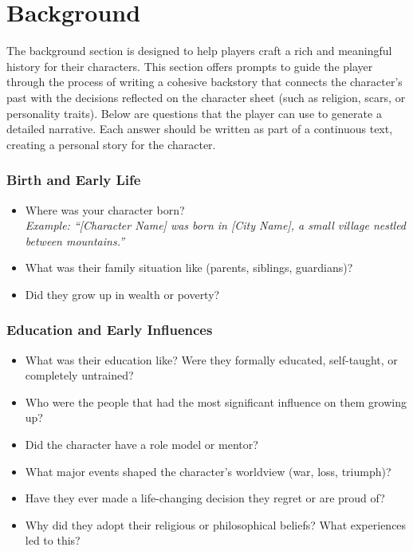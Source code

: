 \documentclass[12pt]{book}
\begin{document}
\chapter{Background}

The background section is designed to help players craft a rich and meaningful history for their characters. This section offers prompts to guide the player through the process of writing a cohesive backstory that connects the character's past with the decisions reflected on the character sheet (such as religion, scars, or personality traits). Below are questions that the player can use to generate a detailed narrative. Each answer should be written as part of a continuous text, creating a personal story for the character.

\subsection*{Birth and Early Life}

\begin{itemize}
    \item Where was your character born? \\
    \textit{Example: ``[Character Name] was born in [City Name], a small village nestled between mountains.''}
    
    \item What was their family situation like (parents, siblings, guardians)?
    \item Did they grow up in wealth or poverty?
\end{itemize}

\subsection*{Education and Early Influences}

\begin{itemize}
    \item What was their education like? Were they formally educated, self-taught, or completely untrained?
    \item Who were the people that had the most significant influence on them growing up?
    \item Did the character have a role model or mentor?
    \item What major events shaped the character’s worldview (war, loss, triumph)?
    \item Have they ever made a life-changing decision they regret or are proud of?
    \item Why did they adopt their religious or philosophical beliefs? What experiences led to this?
\end{itemize}
\end{document}
